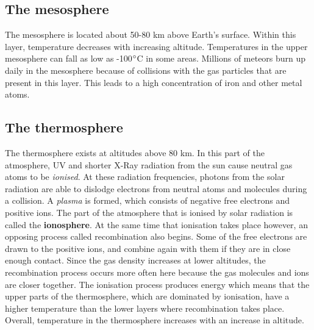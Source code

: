 \subsection{The mesosphere}

The mesosphere is located about 50-80 km above Earth's surface. Within this layer, temperature decreases with increasing altitude. Temperatures in the upper mesosphere can fall as low as -100$^{\circ}$C in some areas. Millions of meteors burn up daily in the mesosphere because of collisions with the gas particles that are present in this layer. This leads to a high concentration of iron and other metal atoms.

\subsection{The thermosphere}

The thermosphere exists at altitudes above 80 km. In this part of the atmosphere, UV and shorter X-Ray radiation from the sun cause neutral gas atoms to be \textit{ionised}. At these radiation frequencies, photons from the solar radiation are able to dislodge electrons from neutral atoms and molecules during a collision. A \textit{plasma} is formed, which consists of negative free electrons and positive ions. The part of the atmosphere that is ionised by solar radiation is called the \textbf{ionosphere}. At the same time that ionisation takes place however, an opposing process called recombination also begins. Some of the free electrons are drawn to the positive ions, and combine again with them if they are in close enough contact. Since the gas density increases at lower altitudes, the recombination process occurs more often here because the gas molecules and ions are closer together. The ionisation process produces energy which means that the upper parts of the thermosphere, which are dominated by ionisation, have a higher temperature than the lower layers where recombination takes place. Overall, temperature in the thermosphere increases with an increase in altitude.\\


